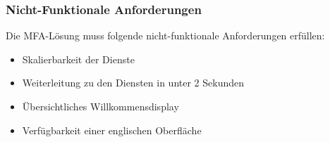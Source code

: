 \subsubsection{Nicht-Funktionale Anforderungen}
\label{sec:Nicht-Funktional}
Die \acs{MFA}-Lösung muss folgende nicht-funktionale Anforderungen erfüllen:
\begin{itemize} [label=--]
	\item Skalierbarkeit der Dienste
	\item Weiterleitung zu den Diensten in unter 2 Sekunden
	\item Übersichtliches Willkommensdisplay
	\item Verfügbarkeit einer englischen Oberfläche
\end{itemize}